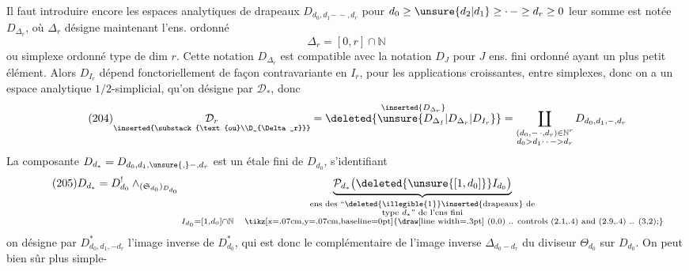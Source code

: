 Il faut introduire encore les espaces analytiques
de drapeaux $D_{d_0,d_1\mathord{-\, -},d_r}$ pour $d_0\geq \unsure{d_2|d_1}\geq\mathord{\cdot\,-}\geq d_r\geq0$
leur somme est notée $D_{\Delta_r}$, où $\Delta_r$ désigne
maintenant l'ens. ordonné
\[
\tag{203}\Delta_r=[0,r]\cap\mathbb N
\]
ou simplexe ordonné type de dim $r$. Cette notation
$D_{\Delta_r}$ est compatible avec la notation $D_J$ pour $J$
ens. fini ordonné ayant un plus petit élément.
Alors $D_{I_r}$ dépend fonctoriellement de façon
contravariante en $I_r$, pour les applications
croissantes, entre simplexes, donc on a un
espace analytique $1/2$-simplicial, qu'on désigne par
$\mathcal D_*$, donc
\[
\tag{204}
\underset{\inserted{\substack{\text{ou}\\D_{\Delta_r}}}}{\mathcal D_r}
=\overset{\inserted{D_{\Delta_r}}}{\deleted{\unsure{D_{\Delta_I}|D_{\Delta_r}|D_{I_r}}}}
=\coprod_{\substack{(d_0,\mathord{-\,\cdot},d_r)\in\mathbb N^r\\d_0>d_1\mathord{\cdot\,\cdot\,-}>d_r}}
D_{d_0,d_1,\mathord{-},d_r}
\]
La composante $D_{d_*}=D_{d_0,d_1,\unsure{,}\mathord{-},d_r}$ est
un  étale fini de $D_{d_0}$, s'identifiant
\[
\tag{205}
D_{d_*}=D^{!}_{d_0}\wedge_{(\mathfrak S_{d_0})_{D_{d_0}}}
\underbrace{\mathcal P_{d_*}\bigl(\deleted{\unsure{[1,d_0]}}I_{d_0}\bigr)}_{
\substack{\text{ens des ``\deleted{\illegible{1}}\inserted{drapeaux} de}\\
\text{type }d_*\text{'' de l'ens fini}\\
I_{d_0}=[1,d_0]\cap\mathbb N\quad\text{\tikz[x=.07cm,y=.07cm,baseline=0pt]{\draw[line width=.3pt] (0,0) .. controls (2.1,.4) and (2.9,.4) .. (3,2);}}}}
\]
on désigne par $D^*_{d_0,d_1,\mathord{-}d_r}$ l'image inverse
de $D^*_{d_0}$, qui est donc le complémentaire
de l'image inverse $\Delta_{d_0-d_r}$ du diviseur
$\Theta_{d_0}$ sur $D_{d_0}$. On peut bien sûr plus simple-
